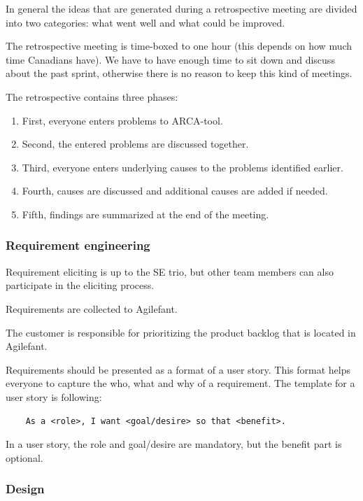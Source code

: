 In general the ideas that are generated during a retrospective meeting are
divided into two categories: what went well and what could be improved.

The retrospective meeting is time-boxed to one hour (this depends on how much
time Canadians have). We have to have enough time to sit down and discuss about
the past sprint, otherwise there is no reason to keep this kind of meetings.

The retrospective contains three phases:

\begin{enumerate}
\item First, everyone enters problems to ARCA-tool.
\item Second, the entered problems are discussed together.
\item Third, everyone enters underlying causes to the problems identified
earlier.
\item Fourth, causes are discussed and additional causes are added if needed.
\item Fifth, findings are summarized at the end of the meeting.
\end{enumerate}

\subsubsection{Requirement engineering}

Requirement eliciting is up to the SE trio, but other team members can also 
participate in the eliciting process.

Requirements are collected to Agilefant. 

The customer is responsible for prioritizing the product backlog that is located 
in Agilefant.

Requirements should be presented as a format of a user story. This format helps 
everyone to capture the who, what and why of a requirement. The template for a 
user story is following:

\begin{verbatim}
    As a <role>, I want <goal/desire> so that <benefit>.
\end{verbatim}

In a user story, the role and goal/desire are mandatory, but the benefit part is 
optional.

\subsubsection{Design}



